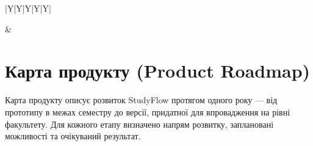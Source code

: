 \documentclass[12pt]{article}
\begin{document}
\begin{landscape}
\begin{tabularx}{\linewidth}{|Y|Y|Y|Y|Y|}
{\begin{itemize}[leftmargin=1em,nosep]
\end{itemize}} &
\\
\hline
\end{tabularx}
\end{landscape}
\restoregeometry

\section{Карта продукту (Product Roadmap)}
Карта продукту описує розвиток StudyFlow протягом одного року --- від прототипу в межах семестру до версії, придатної для впровадження на рівні факультету. Для кожного етапу визначено напрям розвитку, заплановані можливості та очікуваний результат.
\end{document}
